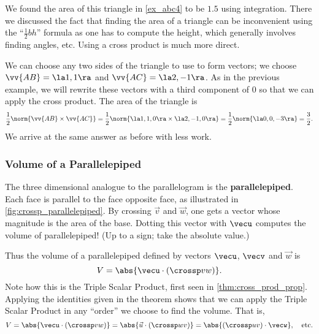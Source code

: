 {We found the area of this triangle in \autoref{ex_abc4} to be $1.5$ using integration. There we discussed the fact that finding the area of a triangle can be inconvenient using the ``$\frac12bh$'' formula as one has to compute the height, which generally involves finding angles, etc. Using a cross product is much more direct.

We can choose any two sides of the triangle to use to form vectors; we choose $\vv{AB} = \la 1,1\ra$ and $\vv{AC}=\la 2,-1\ra$. As in the previous example, we will rewrite these vectors with a third component of 0 so that we can apply the cross product. The area of the triangle is
$$\frac12\norm{\vv{AB}\times\vv{AC}} = \frac12\norm{\la 1,1,0\ra \times \la 2,-1,0\ra} = \frac12\norm{\la 0,0,-3\ra} = \frac32.$$
We arrive at the same answer as before with less work.}

\subsubsection*{Volume of a Parallelepiped}

The three dimensional analogue to the parallelogram is the \textbf{parallelepiped}. Each face is parallel to the face opposite face, as illustrated in \autoref{fig:crossp_parallelepiped}. By crossing $\vec v$ and $\vec w$, one gets a vector whose magnitude is the area of the base. Dotting this vector with $\vecu$ computes the volume of parallelepiped! (Up to a sign; take the absolute value.)

Thus the volume of a parallelepiped defined by vectors $\vecu$, $\vecv$ and $\vec w$ is
\begin{equation}
V = \abs{\vecu\cdot (\crossp vw)}.\label{eq:crossp2}
\end{equation}
Note how this is the Triple Scalar Product, first seen in \autoref{thm:cross_prod_prop}. Applying the identities given in the theorem shows that we can apply the Triple Scalar Product in any ``order'' we choose to find the volume. That is,
$$V = \abs{\vecu\cdot(\crossp vw)} = \abs{\vec u\cdot (\crossp wv)} = \abs{(\crossp uv)\cdot \vecw},\quad \text{etc.}$$

